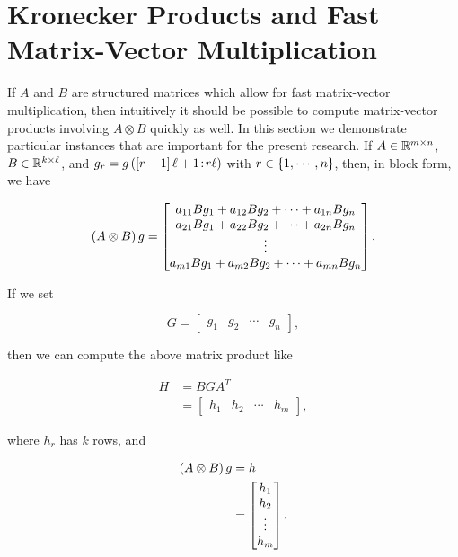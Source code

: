 \section{Kronecker Products and Fast Matrix-Vector Multiplication}
\label{sec:FastKronProduct}

If $A$ and $B$ are structured matrices which allow for fast matrix-vector
multiplication, then intuitively it should be possible to compute
matrix-vector products involving $A\otimes B$ quickly as well.
In this section we demonstrate particular instances that are important
for the present research.
If $A\in\mathbb{R}^{m\times n}$, $B\in\mathbb{R}^{k\times\ell}$, and 
$g_{r} = g\left( \left[ r-1 \right]\ell + 1\!:\!r\ell \right)$ with
$r\in\left\{ 1,\cdots,n \right\}$, then, in block form, we have

\begin{equation}
    \left( A\otimes B \right)g = \begin{bmatrix}
        a_{11}Bg_{1} + a_{12}Bg_{2} + \cdots + a_{1n}Bg_{n} \\
        a_{21}Bg_{1} + a_{22}Bg_{2} + \cdots + a_{2n}Bg_{n} \\ \vdots \\
        a_{m1}Bg_{1} + a_{m2}Bg_{2} + \cdots + a_{mn}Bg_{n} \\
    \end{bmatrix}.
\end{equation}

\noindent
If we set

\begin{equation}
    G = \begin{bmatrix} g_{1} & g_{2} & \cdots & g_{n} \end{bmatrix},
\end{equation}

\noindent
then we can compute the above matrix product like

\begin{samepage}
\begin{align}
    H &= BGA^{T} \nonumber\\
    &= \begin{bmatrix} h_{1} & h_{2} & \cdots & h_{m} \end{bmatrix},
\end{align}
\end{samepage}

\noindent
where $h_{r}$ has $k$ rows, and

\begin{align}
    \left( A\otimes B \right)g &= h \nonumber\\
        &= \begin{bmatrix} h_{1} \\ h_{2} \\ \vdots \\ h_{m} \end{bmatrix}.
\end{align}

